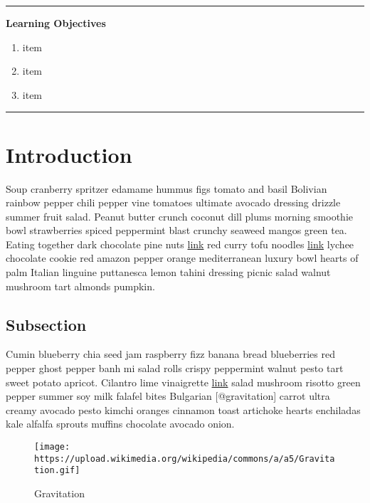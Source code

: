 \documentclass[
  11pt,
,
onecolumn,
openany
]{book}
\providecommand{\tightlist}{%
  \setlength{\itemsep}{0pt}\setlength{\parskip}{0pt}}
\begin{document}
\begin{center}\rule{0.5\linewidth}{0.5pt}\end{center}

\textbf{Learning Objectives}

\begin{enumerate}
\def\labelenumi{\arabic{enumi}.}
\tightlist
\item
  item
\item
  item
\item
  item
\end{enumerate}

\begin{center}\rule{0.5\linewidth}{0.5pt}\end{center}

\hypertarget{introduction}{%
\section{Introduction}\label{introduction}}

Soup cranberry spritzer edamame hummus figs tomato and basil Bolivian rainbow
pepper chili pepper vine tomatoes ultimate avocado dressing drizzle summer
fruit salad. Peanut butter crunch coconut dill plums morning smoothie bowl
strawberries spiced peppermint blast crunchy seaweed mangos green tea. Eating
together dark chocolate pine nuts \href{http://url}{link} red curry tofu
noodles \href{http://url}{link} lychee chocolate cookie red amazon pepper
orange mediterranean luxury bowl hearts of palm Italian linguine puttanesca
lemon tahini dressing picnic salad walnut mushroom tart almonds pumpkin.

\hypertarget{subsection}{%
\subsection{Subsection}\label{subsection}}

Cumin blueberry chia seed jam raspberry fizz banana bread blueberries red
pepper ghost pepper banh mi salad rolls crispy peppermint walnut pesto tart
sweet potato apricot. Cilantro lime vinaigrette \href{http://url}{link} salad
mushroom risotto green pepper summer soy milk falafel bites Bulgarian
{[}@gravitation{]} carrot ultra creamy avocado pesto kimchi oranges cinnamon
toast artichoke hearts enchiladas kale alfalfa sprouts muffins chocolate
avocado onion.

\begin{figure}
\hypertarget{fig:gravitation}{%
\centering
\texttt{[image: https://upload.wikimedia.org/wikipedia/commons/a/a5/Gravitation.gif]}
\caption{Gravitation}\label{fig:gravitation}
}
\end{figure}
\end{document}
